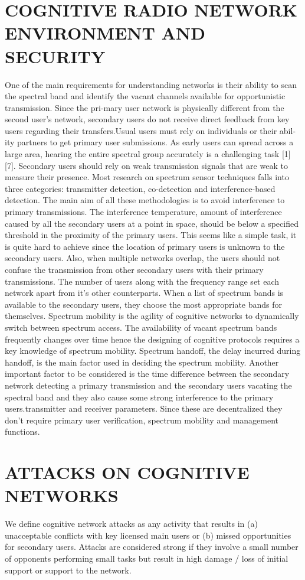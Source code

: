 \documentclass{article}
\begin{document}
\section{COGNITIVE RADIO NETWORK ENVIRONMENT AND SECURITY}
One of the main requirements for understanding networks is
their ability to scan the spectral band and identify the vacant
channels available for opportunistic transmission. Since the
pri-mary user network is physically different from the
second user's network, secondary users do not receive direct
feedback from key users regarding their transfers.Usual
users must rely on individuals or their abil-ity partners to
get primary user submissions. As early users can spread
across a large area, hearing the entire spectral group
accurately is a challenging task [1] [7]. Secondary users
should rely on weak transmission signals that are weak to
measure their presence. Most research on spectrum sensor
techniques falls into three categories: transmitter detection,
co-detection and interference-based detection. The main
aim of all these methodologies is to avoid interference to
primary transmissions. The interference temperature,
amount of interference caused by all the secondary users at
a point in space, should be below a specified threshold in
the proximity of the primary users. This seems like a simple
task, it is quite hard to achieve since the location of primary
users is unknown to the secondary users. Also, when
multiple networks overlap, the users should not confuse the
transmission from other secondary users with their primary
transmissions.
The number of users along with the frequency range set
each network apart from it’s other counterparts. When a list
of spectrum bands is available to the secondary users, they
choose the most appropriate bands for themselves.
Spectrum mobility is the agility of cognitive networks to
dynamically switch between spectrum access. The
availability of vacant spectrum bands frequently changes
over time hence the designing of cognitive protocols
requires a key knowledge of spectrum mobility. Spectrum
handoff, the delay incurred during handoff, is the main
factor used in deciding the spectrum mobility. Another
important factor to be considered is the time difference
between the secondary network detecting a primary
transmission and the secondary users vacating the spectral
band and they also cause some strong interference to the
primary users.transmitter and receiver parameters. Since these are
decentralized they don’t require primary user verification,
spectrum mobility and management functions.
\section{ ATTACKS ON COGNITIVE NETWORKS}
We define cognitive network attacks as any activity that
results in (a) unacceptable conflicts with key licensed main
users or (b) missed opportunities for secondary users.
Attacks are considered strong if they involve a small
number of opponents performing small tasks but result in
high damage / loss of initial support or support to the
network.
\end{document}
